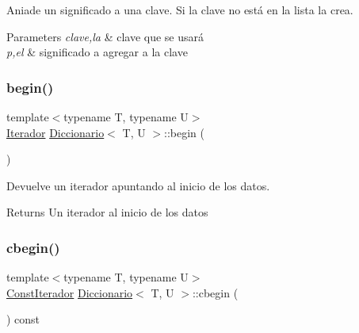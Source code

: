 Aniade un significado a una clave. Si la clave no está en la lista la crea. 


\begin{DoxyParams}{Parameters}
{\em clave,la} & clave que se usará \\
\hline
{\em p,el} & significado a agregar a la clave \\
\hline
\end{DoxyParams}
\mbox{\label{classDiccionario_ae584d64109213b785b2db48e9ef62320}} 
\subsubsection{\texorpdfstring{begin()}{begin()}}
{\footnotesize\ttfamily template$<$typename T, typename U$>$ \\
\hyperlink{classDiccionario_1_1Iterador}{Iterador} \hyperlink{classDiccionario}{Diccionario}$<$ T, U $>$\+::begin (\begin{DoxyParamCaption}{ }\end{DoxyParamCaption})\hspace{0.3cm}{\ttfamily [inline]}}



Devuelve un iterador apuntando al inicio de los datos. 

\begin{DoxyReturn}{Returns}
Un iterador al inicio de los datos 
\end{DoxyReturn}
\mbox{\label{classDiccionario_a497a853fff023e53eeccba5e80c96a50}} 
\subsubsection{\texorpdfstring{cbegin()}{cbegin()}}
{\footnotesize\ttfamily template$<$typename T, typename U$>$ \\
\hyperlink{classDiccionario_1_1ConstIterador}{Const\+Iterador} \hyperlink{classDiccionario}{Diccionario}$<$ T, U $>$\+::cbegin (\begin{DoxyParamCaption}{ }\end{DoxyParamCaption}) const\hspace{0.3cm}{\ttfamily [inline]}}



